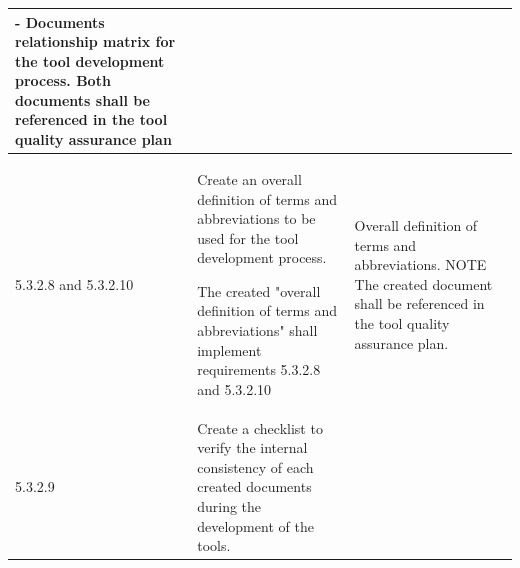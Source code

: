 \documentclass{template/openetcs_report}
\begin{document}
{\begin{longtable}{|p{2cm}|p{9cm}|p{3cm}|}
- Documents relationship matrix for the tool development process.
\linebreak
\linebreak
Both documents shall be referenced in the tool quality assurance plan\\ 
\hline
5.3.2.8 and 5.3.2.10 & Create an overall definition of terms and abbreviations to be used for the tool development process. 

The created "overall definition of terms and abbreviations" shall implement requirements 5.3.2.8 and 5.3.2.10
& Overall definition of terms and abbreviations.
\linebreak
\linebreak
NOTE\linebreak
The created document shall be referenced in the tool quality assurance plan.\\ 
\hline
5.3.2.9 & Create a checklist to verify the internal consistency of each created documents during the development of the tools.



\end{longtable}}
\end{document}
